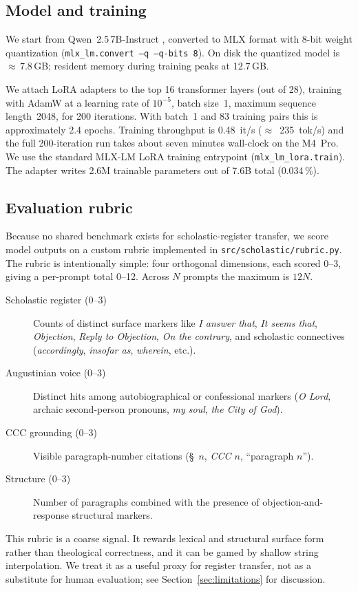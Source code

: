 \subsection{Model and training}
\label{sec:training}

We start from Qwen~2.5\,7B-Instruct \cite{qwen25}, converted to MLX format
with 8-bit weight quantization
(\texttt{mlx\_lm.convert --q --q-bits 8}). On disk the quantized model is
$\approx$\,7.8\,GB; resident memory during training peaks at 12.7\,GB.

We attach LoRA adapters to the top 16 transformer layers (out of 28),
training with AdamW at a learning rate of $10^{-5}$, batch size~1, maximum
sequence length~2048, for 200 iterations. With batch~1 and 83 training
pairs this is approximately 2.4 epochs. Training throughput is
0.48~it/s ($\approx$~235~tok/s) and the full 200-iteration run takes about
seven minutes wall-clock on the M4~Pro. We use the standard MLX-LM LoRA
\cite{mlx} training entrypoint (\texttt{mlx\_lm\_lora.train}). The
adapter writes 2.6M trainable parameters out of 7.6B total
(0.034\,\%).

\subsection{Evaluation rubric}
\label{sec:rubric}

Because no shared benchmark exists for scholastic-register transfer, we
score model outputs on a custom rubric implemented in
\texttt{src/scholastic/rubric.py}. The rubric is intentionally simple:
four orthogonal dimensions, each scored 0--3, giving a per-prompt total
0--12. Across $N$ prompts the maximum is $12N$.

\begin{description}
  \item[Scholastic register (0--3)] Counts of distinct surface markers
        like \emph{I answer that}, \emph{It seems that}, \emph{Objection},
        \emph{Reply to Objection}, \emph{On the contrary}, and
        scholastic connectives (\emph{accordingly}, \emph{insofar as},
        \emph{wherein}, etc.).
  \item[Augustinian voice (0--3)] Distinct hits among autobiographical or
        confessional markers (\emph{O Lord}, archaic second-person
        pronouns, \emph{my soul}, \emph{the City of God}).
  \item[CCC grounding (0--3)] Visible paragraph-number citations (\S~$n$,
        \emph{CCC $n$}, ``paragraph $n$'').
  \item[Structure (0--3)] Number of paragraphs combined with the
        presence of objection-and-response structural markers.
\end{description}

This rubric is a coarse signal. It rewards lexical and structural
surface form rather than theological correctness, and it can be gamed by
shallow string interpolation. We treat it as a useful proxy for
register transfer, not as a substitute for human evaluation; see
Section~\ref{sec:limitations} for discussion.
